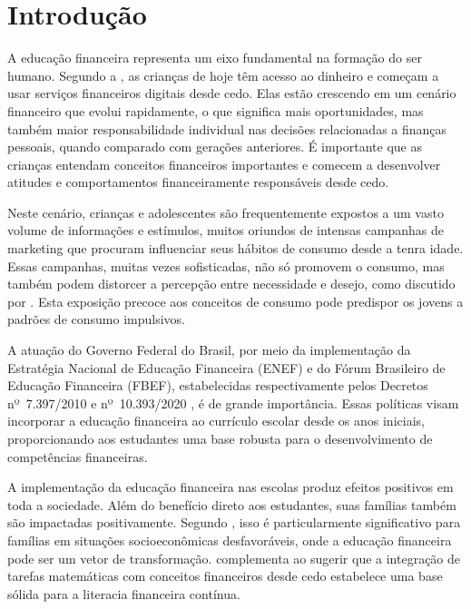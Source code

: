 \chapter{Introdução}

A educação financeira representa um eixo fundamental na formação do ser humano. Segundo a \cite{OECD}, as crianças de hoje têm acesso ao dinheiro e começam a usar serviços financeiros digitais desde cedo. Elas estão crescendo em um cenário financeiro que evolui rapidamente, o que significa mais oportunidades, mas também maior responsabilidade individual nas decisões relacionadas a finanças pessoais, quando comparado com gerações anteriores. É importante que as crianças entendam conceitos financeiros importantes e comecem a desenvolver atitudes e comportamentos financeiramente responsáveis desde cedo.

Neste cenário, crianças e adolescentes são frequentemente expostos a um vasto volume de informações e estímulos, muitos oriundos de intensas campanhas de marketing que procuram influenciar seus hábitos de consumo desde a tenra idade. Essas campanhas, muitas vezes sofisticadas, não só promovem o consumo, mas também podem distorcer a percepção entre necessidade e desejo, como discutido por \cite{Junger_Medeiros_Moura_Barrocal_Amaral_2019}. Esta exposição precoce aos conceitos de consumo pode predispor os jovens a padrões de consumo impulsivos.

A atuação do Governo Federal do Brasil, por meio da implementação da Estratégia Nacional de Educação Financeira (ENEF) e do Fórum Brasileiro de Educação Financeira (FBEF), estabelecidas respectivamente pelos Decretos nº~7.397/2010 e nº~10.393/2020 \cite{decreto_10939}, é de grande importância. Essas políticas visam incorporar a educação financeira ao currículo escolar desde os anos iniciais, proporcionando aos estudantes uma base robusta para o desenvolvimento de competências financeiras.

A implementação da educação financeira nas escolas produz efeitos positivos em toda a sociedade. Além do benefício direto aos estudantes, suas famílias também são impactadas positivamente. Segundo \cite{Frisancho2023Spillover}, isso é particularmente significativo para famílias em situações socioeconômicas desfavoráveis, onde a educação financeira pode ser um vetor de transformação. \cite{Ozkale2023Designing} complementa ao sugerir que a integração de tarefas matemáticas com conceitos financeiros desde cedo estabelece uma base sólida para a literacia financeira contínua.

